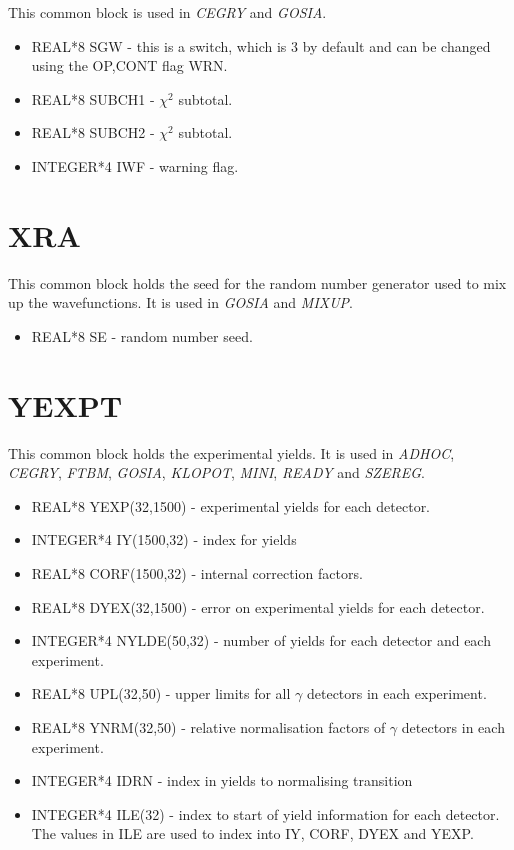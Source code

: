 This common block is used in \emph{CEGRY} and \emph{GOSIA}.

\begin{itemize}
\item REAL*8 SGW - this is a switch, which is 3 by default and can be
changed using the OP,CONT flag WRN.
\item REAL*8 SUBCH1 - $\chi^2$ subtotal.
\item REAL*8 SUBCH2 - $\chi^2$ subtotal.
\item INTEGER*4 IWF - warning flag.
\end{itemize}

\section{XRA}

This common block holds the seed for the random number generator used to mix
up the wavefunctions. It is used in \emph{GOSIA} and \emph{MIXUP}.

\begin{itemize}
\item REAL*8 SE - random number seed.
\end{itemize}

\section{YEXPT}

This common block holds the experimental yields. It is used in \emph{ADHOC},
\emph{CEGRY}, \emph{FTBM}, \emph{GOSIA}, \emph{KLOPOT}, \emph{MINI}, \emph{READY}
and \emph{SZEREG}.

\begin{itemize}
\item REAL*8 YEXP(32,1500) - experimental yields for each detector.
\item INTEGER*4 IY(1500,32) - index for yields
\item REAL*8 CORF(1500,32) - internal correction factors.
\item REAL*8 DYEX(32,1500) - error on experimental yields for each detector.
\item INTEGER*4 NYLDE(50,32) - number of yields for each detector and each
experiment.
\item REAL*8 UPL(32,50) - upper limits for all $\gamma$ detectors in each
experiment.
\item REAL*8 YNRM(32,50) - relative normalisation factors of $\gamma$
detectors in each experiment.
\item INTEGER*4 IDRN - index in yields to normalising transition
\item INTEGER*4 ILE(32) - index to start of yield information for each
detector. The values in ILE are used to index into IY, CORF, DYEX and YEXP.
\end{itemize}

